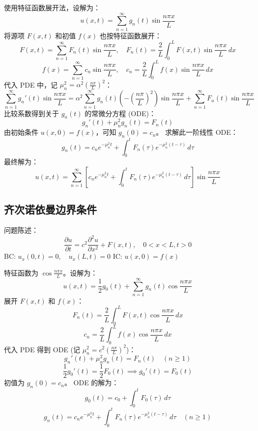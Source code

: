 \documentclass{article}
\begin{document}
	使用特征函数展开法，设解为：
	$$ u(x,t) = \sum_{n=1}^{\infty} g_n(t) \sin\frac{n\pi x}{L} $$
	将源项 $F(x,t)$ 和初值 $f(x)$ 也按特征函数展开：
	$$ F(x,t) = \sum_{n=1}^{\infty} F_n(t) \sin\frac{n\pi x}{L}, \quad F_n(t) = \frac{2}{L} \int_0^L F(x,t) \sin\frac{n\pi x}{L} \,dx $$
	$$ f(x) = \sum_{n=1}^{\infty} c_n \sin\frac{n\pi x}{L}, \quad c_n = \frac{2}{L} \int_0^L f(x) \sin\frac{n\pi x}{L} \,dx $$
	代入 PDE 中，记 $\mu_n^2 = \alpha^2 (\frac{n\pi}{L})^2$：
	$$ \sum_{n=1}^{\infty} g_n'(t) \sin\frac{n\pi x}{L} = \alpha^2 \sum_{n=1}^{\infty} g_n(t) \left( -\left(\frac{n\pi}{L}\right)^2 \right) \sin\frac{n\pi x}{L} + \sum_{n=1}^{\infty} F_n(t) \sin\frac{n\pi x}{L} $$
	比较系数得到关于 $g_n(t)$ 的常微分方程 (ODE)：
	$$ g_n'(t) + \mu_n^2 g_n(t) = F_n(t) $$
	由初始条件 $u(x,0) = f(x)$，可知 $g_n(0) = c_n$。
	求解此一阶线性 ODE：
	$$ g_n(t) = c_n e^{-\mu_n^2 t} + \int_0^t F_n(\tau) e^{-\mu_n^2(t-\tau)} \,d\tau $$
	最终解为：
	$$ u(x,t) = \sum_{n=1}^{\infty} \left[ c_n e^{-\mu_n^2 t} + \int_0^t F_n(\tau) e^{-\mu_n^2(t-\tau)} \,d\tau \right] \sin\frac{n\pi x}{L} $$
	
	\subsection{齐次诺依曼边界条件}
	问题陈述：
	$$ \frac{\partial u}{\partial t} = c^2 \frac{\partial^2 u}{\partial x^2} + F(x,t), \quad 0 < x < L, t > 0 $$
	BC: $u_x(0,t) = 0, \quad u_x(L,t) = 0$
	IC: $u(x,0) = f(x)$
	
	特征函数为 $\cos\frac{n\pi x}{L}$。设解为：
	$$ u(x,t) = \frac{1}{2}g_0(t) + \sum_{n=1}^{\infty} g_n(t) \cos\frac{n\pi x}{L} $$
	展开 $F(x,t)$ 和 $f(x)$：
	$$ F_n(t) = \frac{2}{L} \int_0^L F(x,t)\cos\frac{n\pi x}{L} \,dx $$
	$$ c_n = \frac{2}{L} \int_0^L f(x)\cos\frac{n\pi x}{L} \,dx $$
	代入 PDE 得到 ODE (记 $\mu_n^2 = c^2(\frac{n\pi}{L})^2$)：
	$$ g_n'(t) + \mu_n^2 g_n(t) = F_n(t) \quad (n \ge 1) $$
	$$ \frac{1}{2}g_0'(t) = \frac{1}{2}F_0(t) \implies g_0'(t) = F_0(t) $$
	初值为 $g_n(0) = c_n$。
	ODE 的解为：
	$$ g_0(t) = c_0 + \int_0^t F_0(\tau) \,d\tau $$
	$$ g_n(t) = c_n e^{-\mu_n^2 t} + \int_0^t F_n(\tau) e^{-\mu_n^2(t-\tau)} \,d\tau \quad (n \ge 1) $$
	
\end{document}
